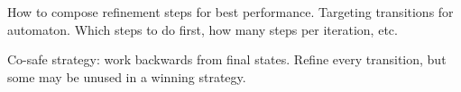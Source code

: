 How to compose refinement steps for best performance.
Targeting transitions for automaton.
Which steps to do first, how many steps per iteration, etc.

Co-safe strategy: work backwards from final states.
Refine every transition, but some may be unused in a winning strategy.

